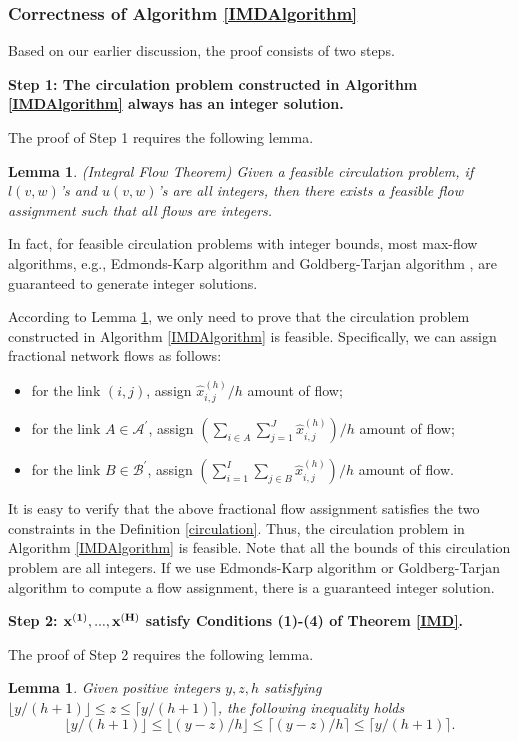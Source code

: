 \documentclass[letterpaper,twocolumn,10pt]{article}
\newtheorem{lem}[thm]{Lemma}
\begin{document}
\subsubsection{Correctness of Algorithm \ref{IMDAlgorithm}}\label{correctnessproofsection}
Based on our earlier discussion, the proof consists of two steps.

{\bf Step 1: The circulation problem constructed in Algorithm \ref{IMDAlgorithm} always has an integer solution.}

The proof of Step 1 requires the following lemma.
\begin{lem}\label{integralflowtheorem}
(Integral Flow Theorem) Given a feasible circulation problem, if $l(v,w)$'s and $u(v,w)$'s are all integers, then there exists a feasible flow assignment such that all flows are integers.
\end{lem}
In fact, for feasible circulation problems with integer bounds, most max-flow algorithms, e.g., Edmonds-Karp algorithm \cite{FlowAlgorithm} and Goldberg-Tarjan algorithm \cite{PreFlow}, are guaranteed to generate integer solutions.

According to Lemma \ref{integralflowtheorem}, we only need to prove that the circulation problem constructed in Algorithm \ref{IMDAlgorithm} is feasible. Specifically, we can assign fractional network flows as follows:
\begin{itemize}
  \item for the link $(i,j)$, assign $\hat{x}^{(h)}_{i,j}/{h}$ amount of flow;
  \item for the link $A\in\mathcal{A}^{\prime}$, assign $(\sum_{i\in A}\sum_{j=1}^J \hat{x}^{(h)}_{i,j})/{h}$ amount of flow;
  \item for the link $B\in\mathcal{B}^{\prime}$, assign $(\sum_{i=1}^I\sum_{j\in B} \hat{x}^{(h)}_{i,j})/{h}$ amount of flow.
\end{itemize}
It is easy to verify that the above fractional flow assignment satisfies the two constraints in the Definition \ref{circulation}. Thus, the circulation problem in Algorithm \ref{IMDAlgorithm} is feasible. Note that all the bounds of this circulation problem are all integers. If we use Edmonds-Karp algorithm or Goldberg-Tarjan algorithm to compute a flow assignment, there is a guaranteed integer solution.

{\bf Step 2: ${\bf x^{(1)},...,x^{(H)}}$ satisfy Conditions (1)-(4) of Theorem \ref{IMD}.}

The proof of Step 2 requires the following lemma.
\begin{lem}\label{floorceilinequality}
Given positive integers $y, z, h$ satisfying $\lfloor y/(h+1) \rfloor\leq z \leq \lceil y/(h+1)\rceil$, the following inequality holds $$\lfloor y/(h+1) \rfloor\leq \lfloor (y-z)/h \rfloor\leq \lceil (y-z)/h\rceil \leq \lceil y/(h+1)\rceil.$$
\end{lem}
\end{document}
